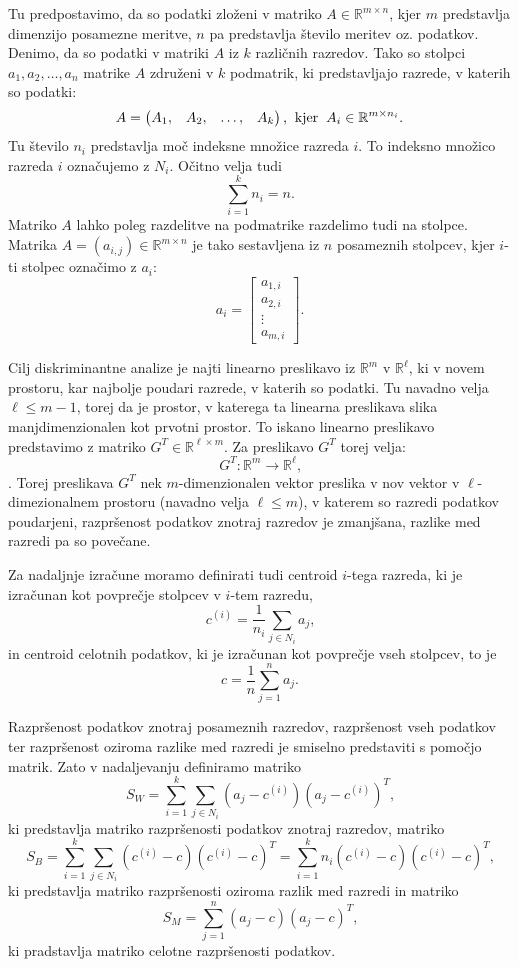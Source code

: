 \documentclass[mat1]{article}
\begin{document}
Tu predpostavimo, da so podatki zloženi v matriko $A \in \mathbb{R}^{m \times n}$, kjer $m$ predstavlja dimenzijo posamezne meritve, $n$ pa predstavlja število meritev oz. podatkov. Denimo, da so podatki v matriki $A$ iz $k$ različnih razredov. Tako so stolpci $a_1, a_2, \ldots, a_n$ matrike $A$ združeni v $k$ podmatrik, ki predstavljajo razrede, v katerih so podatki:
$$ A = 
\begin{pmatrix}
A_1, & A_2, & \ldots, & A_k
\end{pmatrix} \text{,}
\hspace{2mm} \text{kjer} \hspace{2mm} A_i \in \mathbb{R}^{m \times n_i} \text{.}
$$ 
Tu število $n_i$ predstavlja moč indeksne množice razreda $i$. To indeksno množico razreda $i$ označujemo z $N_i$. Očitno velja tudi $$
\sum_{i=1}^{k}n_i = n \text{.}$$
Matriko $A$ lahko poleg razdelitve na podmatrike razdelimo tudi na stolpce. Matrika $A = \left( a_{i ,j} \right)  \in \mathbb{R}^{m \times n}$ je tako sestavljena iz $n$ posameznih stolpcev, kjer $i$-ti stolpec označimo z $a_i$:
$$ a_i =
\begin{bmatrix}
a_{1, i} \\
a_{2, i} \\
\vdots \\
a_{m, i}
\end{bmatrix}
\text{.}
$$

Cilj diskriminantne analize je najti linearno preslikavo iz $\mathbb{R}^m$ v $\mathbb{R}^\ell$, ki v novem prostoru, kar najbolje poudari razrede, v katerih so podatki. Tu navadno velja $\ell \leq m - 1$, torej da je prostor, v katerega ta linearna preslikava slika manjdimenzionalen kot prvotni prostor. To iskano linearno preslikavo predstavimo z matriko $G^T \in \mathbb{R}^{\ell \times m}$.
Za preslikavo $G^T$ torej velja: $$G^T : \mathbb{R}^m \rightarrow \mathbb{R}^\ell \text{,}$$. Torej preslikava $G^T$ nek $m$-dimenzionalen vektor preslika v nov vektor v $\ell$-dimezionalnem prostoru (navadno velja $\ell \leq m$), v katerem so razredi podatkov poudarjeni, razpršenost podatkov znotraj razredov je zmanjšana, razlike med razredi pa so povečane.

Za nadaljnje izračune moramo definirati tudi centroid $i$-tega razreda, ki je izračunan kot povprečje stolpcev v $i$-tem razredu, 
$$c^{(i)} = \frac{1}{n_i} \sum_{j \in N_i} a_j \text{,}
$$
in centroid celotnih podatkov, ki je izračunan kot povprečje vseh stolpcev, to je
$$c = \frac{1}{n} \sum_{j = 1}^{n} a_j \text{.}
$$

Razpršenost podatkov znotraj posameznih razredov, razpršenost vseh podatkov ter razpršenost oziroma razlike med razredi je smiselno predstaviti s pomočjo matrik. Zato v nadaljevanju definiramo matriko
$$S_W = \sum_{i = 1}^{k} \sum_{j \in N_i}(a_j - c^{(i)})(a_j - c^{(i)})^T\text{,}$$
ki predstavlja matriko razpršenosti podatkov znotraj razredov, matriko
$$S_B = \sum_{i = 1}^{k} \sum_{j \in N_i} ( c^{(i)} - c)( c^{(i)} - c)^T = \sum_{i = 1}^{k} n_i ( c^{(i)} - c)( c^{(i)} - c)^T \text{,}$$
ki predstavlja matriko razpršenosti oziroma razlik med razredi in matriko
$$S_M = \sum_{j = 1}^{n} (a_j - c)(a_j - c)^T \text{,}$$
ki pradstavlja matriko celotne razpršenosti podatkov.
\end{document}
